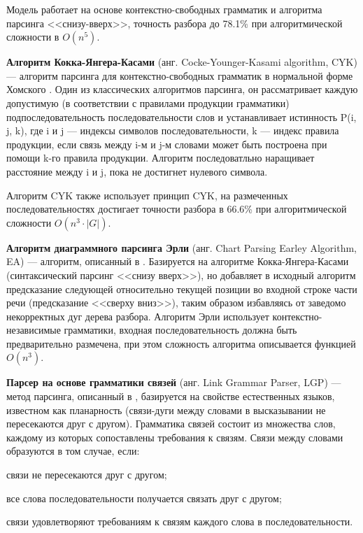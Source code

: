 Модель работает на основе контекстно-свободных грамматик и алгоритма парсинга <<снизу-вверх>>, точность разбора до 78.1\% при алгоритмической сложности в \(O(n^5)\).

\textbf{Алгоритм Кокка-Янгера-Касами} (анг. Cocke-Younger-Kasami algorithm, CYK) --- алгоритм парсинга для контекстно-свободных грамматик в нормальной форме Хомского \cite{wiki_cyk}. Один из классических алгоритмов парсинга, он рассматривает каждую допустимую (в соответствии с правилами продукции грамматики) подпоследовательность последовательности слов и устанавливает истинность P(i, j, k), где i и j --- индексы символов последовательности, k --- индекс правила продукции, если связь между i-м и j-м словами может быть построена при помощи k-го правила продукции. Алгоритм последоватльно наращивает расстояние между i и j, пока не достигнет нулевого символа.

Алгоритм CYK также использует принцип CYK, на размеченных последовательностях достигает точности разбора в 66.6\% при алгоритмической сложности \(O(n^3 \cdot |G|)\).

\textbf{Алгоритм диаграммного парсинга Эрли} (анг. Chart Parsing Earley Algorithm, EA) --- алгоритм, описанный в \cite{webbe}. Базируется на алгоритме Кокка-Янгера-Касами (синтаксический парсинг <<снизу вверх>>), но добавляет в исходный алгоритм предсказание следующей относительно текущей позиции во входной строке части речи (предсказание <<сверху вниз>>), таким образом избавляясь от заведомо некорректных дуг дерева разбора. Алгоритм Эрли использует контекстно-независимые грамматики, входная последовательность должна быть предварительно размечена, при этом сложность алгоритма описывается функцией \(O(n^3)\).

\textbf{Парсер на основе грамматики связей} (анг. Link Grammar Parser, LGP) --- метод парсинга, описанный в \cite{sleator}, базируется на свойстве естественных языков, известном как планарность (связи-дуги между словами в высказывании не пересекаются друг с другом). Грамматика связей состоит из множества слов, каждому из которых сопоставлены требования к связям. Связи между словами образуются в том случае, если:
\begin{list}{}{\leftmargin=1.5cm}
	\item связи не пересекаются друг с другом;
	\item все слова последовательности получается связать друг с другом;
	\item связи удовлетворяют требованиям к связям каждого слова в последовательности.
\end{list}

